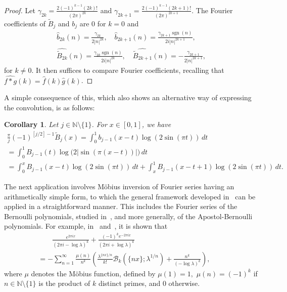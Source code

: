 \documentclass[11pt,a4paper,reqno]{amsart}
\newcommand{\B}{\mathcal{B}}
\newcommand{\N}{\mathbb{N}}
\let\hat\widehat
\let\tilde\widetilde
\newcommand{\sgn}{\operatorname{sgn}}
\theoremstyle{plain}
\newtheorem{cor}[theorem]{Corollary}
\theoremstyle{remark}
\numberwithin{equation}{section}
\begin{document}
\begin{proof}
Let $\gamma_{2k} = \frac{2(-1)^{k-1}(2k)!}{(2\pi)^{2k}}$
and $\gamma_{2k+1} = \frac{2(-1)^{k-1}(2k+1)!}{(2\pi)^{2k+1}}$.
The Fourier coefficients of $\tilde{B}_{j}$ and $b_{j}$ are $0$ for $k=0$ and
\begin{gather*}
  \hat{b}_{2k}(n) = \frac{\gamma_{2k}}{2 |n|^{2k}},
  \quad
  \hat{b}_{2k+1}(n) = \frac{\gamma_{2k+1} \sgn (n)}{2 i |n|^{2k+1}},
  \\
  \widehat{\tilde{B}_{2k}}(n) = \frac{\gamma_{2k} \sgn (n)}{2 i |n|^{2k}},
  \quad
  \widehat{\tilde{B}_{2k+1}}(n) = -\frac{\gamma_{2k+1}}{2 |n|^{2k+1}},
\end{gather*}
for $k\not=0$. It then suffices to compare Fourier coefficients, recalling that $\widehat{f*g}(k) = \hat{f}(k)\hat{g}(k)$.
\end{proof}


A simple consequence of this, which also shows an alternative way of expressing the convolution, is as follows:

\begin{cor}
Let $j\in \N \setminus\{1\}$. For $x\in [0,1]$, we have
\begin{multline*}
  \frac{\pi}{j}(-1)^{[j/2]-1} \tilde{B}_{j}(x)
  = \int_0^1 b_{j-1}(x-t) \log(2\sin(\pi t))\,dt
  \\
  = \int_0^1 B_{j-1}(t) \log\big(2|\sin(\pi(x-t))|\big)\,dt
  \\
  = \int_0^x B_{j-1}(x-t) \log(2\sin(\pi t))\,dt
  +\int_x^1 B_{j-1}(x-t+1) \log(2\sin(\pi t))\,dt.
\end{multline*}
\end{cor}

The next application involves M\"obius inversion of Fourier series having an arithmetically simple form, to which the general framework developed in~\cite{BNV} can be applied in a straightforward manner. This includes the Fourier series of the Bernoulli polynomials, studied in~\cite{NRV-JAT}, and more generally, of the Apostol-Bernoulli polynomials. For example, in~\cite{Bayad} and~\cite{NRV-MC2}, it is shown that
\begin{multline*}
\qquad
  \frac{e^{2 \pi i x}}{(2 \pi i - \log \lambda)^k}
    + \frac{(-1)^k e^{-2 \pi i x}}{(2 \pi i + \log \lambda)^k}
  \\
  = - \sum_{n=1}^{\infty} \frac{\mu(n)}{n^{k}}
    \left(
    \frac{\lambda^{\{nx\}/n}}{k!} \B_{k}(\{nx\};\lambda^{1/n}) + \frac{n^{k}}{(-\log \lambda)^{k}}
    \right),
\qquad
\end{multline*}
where $\mu$ denotes the M\"obius function, defined by $\mu(1)=1,$ $\mu(n)=(-1)^k$ if $n\in \N \setminus\{1\}$ is the product of $k$ distinct primes, and $0$ otherwise.
\end{document}
